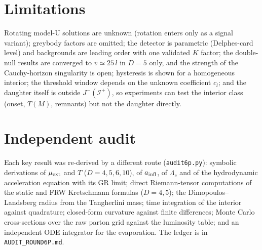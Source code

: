 \documentclass[11pt,a4paper]{article}
\theoremstyle{remark}\newtheorem{remark}[theorem]{Remark}
\begin{document}
\section{Limitations}
Rotating model-U solutions are unknown (rotation enters only as a signal variant); greybody factors are omitted; the detector is
parametric (Delphes-card level) and backgrounds are leading order with one validated $K$ factor; the double-null results are converged to
$v\simeq25\,l$ in $D=5$ only, and the strength of the Cauchy-horizon singularity is open; hysteresis is shown for a homogeneous interior;
the threshold window depends on the unknown coefficient $c_l$; and
the daughter itself is outside $J^-(\mathcal I^+)$, so experiments can test the interior class (onset, $T(M)$, remnants) but not the daughter
directly.

\FloatBarrier
\appendix
\section{Independent audit}\label{app:audit}
Each key result was re-derived by a different route (\texttt{audit6p.py}): symbolic derivations of $\mu_{\rm ext}$ and $T$ ($D=4,5,6,10$),
of $a_{\rm infl}$, of $\Lambda_c$ and of the hydrodynamic acceleration equation with its GR limit; direct Riemann-tensor computations of the
static and FRW Kretschmann formulas ($D=4,5$); the Dimopoulos--Landsberg radius from the Tangherlini mass; time integration of the interior
against quadrature; closed-form curvature against finite differences; Monte Carlo cross-sections over the raw parton grid against the
luminosity table; and an independent ODE integrator for the evaporation. The ledger is in \texttt{AUDIT\_ROUND6P.md}.
\end{document}
